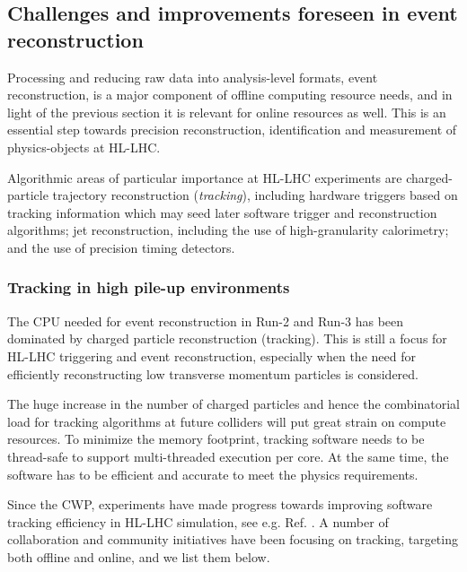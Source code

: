 \hypertarget{challenges-and-improvements-foreseen-in-event-reconstruction}{%
\subsection{Challenges and improvements foreseen in event
reconstruction}\label{challenges-and-improvements-foreseen-in-event-reconstruction}}

Processing and reducing raw data into analysis-level formats, event
reconstruction, is a major component of offline computing resource
needs, and in light of the previous section it is relevant for online
resources as well. This is an essential step towards precision
reconstruction, identification and measurement of physics-objects at
HL-LHC.

Algorithmic areas of particular importance at HL-LHC experiments are
charged-particle trajectory reconstruction (\textit{tracking}), including
hardware triggers based on tracking information which may seed later
software trigger and reconstruction algorithms; jet reconstruction,
including the use of high-granularity calorimetry; and the use of
precision timing detectors.

\hypertarget{tracking-in-high-pile-up-environments}{%
\subsubsection{Tracking in high pile-up
environments}\label{tracking-in-high-pile-up-environments}}

The CPU needed for event reconstruction in Run-2 and Run-3 has been
dominated by charged particle reconstruction (tracking). This is still a
focus for HL-LHC triggering and event reconstruction, especially when
the need for efficiently reconstructing low transverse momentum
particles is considered.

The huge increase in the number of charged particles and hence the
combinatorial load for tracking algorithms at future colliders will put
great strain on compute resources. To minimize the memory footprint,
tracking software needs to be thread-safe to support multi-threaded
execution per core. At the same time, the software has to be efficient
and accurate to meet the physics requirements.

Since the CWP, experiments have made progress towards improving software
tracking efficiency in HL-LHC simulation, see e.g. Ref. \cite{ATL-PHYS-PUB-2019-041}. A
number of collaboration and community initiatives have been focusing on
tracking, targeting both offline and online, and we list them below.


